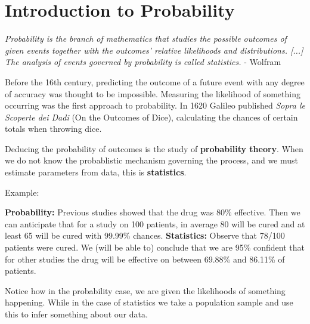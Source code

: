 \chapter{Introduction to Probability}
\label{chapter1}

\begin{displayquote}
	\textit{Probability is the branch of mathematics that studies the possible outcomes of given events together with the outcomes' relative likelihoods and distributions. [...] The analysis of events governed by probability is called statistics.} - Wolfram
\end{displayquote}

Before the 16th century, predicting the outcome of a future event
with any degree of accuracy was thought to be impossible. Measuring
the likelihood of something occurring was the first approach to probability.
In 1620 Galileo published \textit{Sopra le Scoperte dei Dadi} (On the Outcomes of Dice),
calculating the chances of certain totals when throwing dice. \newline \par

Deducing the probability of outcomes is the study of \textbf{probability theory}.
When we do not know the probablistic mechanism governing the process, and we must estimate
parameters from data, this is \textbf{statistics}. \newline \par

{\Large Example:}\par
\begin{adjustwidth}{2cm}{}
	\textbf{Probability:} Previous studies showed that the drug was 80\% effective.
	Then we can anticipate that for a study on 100 patients, in average 80 will be cured
	and at least 65 will be cured with 99.99\% chances.\newline
	\textbf{Statistics:} Observe that 78/100 patients were cured. We (will be able to)
	conclude that we are 95\% confident that for other studies the drug will be effective
	on between 69.88\% and 86.11\% of patients.\newline \newline

	Notice how in the probability case, we are given the likelihoods of something happening.
	While in the case of statistics we take a population sample and use this to infer something
	about our data.
\end{adjustwidth}

